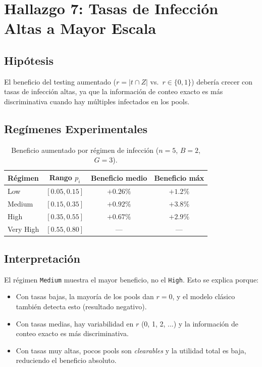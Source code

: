 \documentclass[11pt, a4paper]{article}
\begin{document}
\section{Hallazgo 7: Tasas de Infecci\'on Altas a Mayor Escala}

\subsection{Hip\'otesis}
El beneficio del testing aumentado ($r = |t \cap Z|$ vs.\ $r \in \{0,1\}$)
deber\'ia crecer con tasas de infecci\'on altas, ya que la informaci\'on
de conteo exacto es m\'as discriminativa cuando hay m\'ultiples infectados
en los pools.

\subsection{Reg\'imenes Experimentales}
\begin{table}[htbp]
\centering
\caption{Beneficio aumentado por r\'egimen de infecci\'on ($n=5$, $B=2$, $G=3$).}
\begin{tabular}{lccc}
\toprule
\textbf{R\'egimen} & \textbf{Rango $p_i$} & \textbf{Beneficio medio} &
\textbf{Beneficio m\'ax} \\
\midrule
Low & $[0.05, 0.15]$ & $+0.26\%$ & $+1.2\%$ \\
Medium & $[0.15, 0.35]$ & $+0.92\%$ & $+3.8\%$ \\
High & $[0.35, 0.55]$ & $+0.67\%$ & $+2.9\%$ \\
Very High & $[0.55, 0.80]$ & --- & --- \\
\bottomrule
\end{tabular}
\end{table}

\subsection{Interpretaci\'on}
El r\'egimen \texttt{Medium} muestra el mayor beneficio, no el
\texttt{High}. Esto se explica porque:
\begin{itemize}[nosep]
    \item Con tasas bajas, la mayor\'ia de los pools dan $r=0$, y el
    modelo cl\'asico tambi\'en detecta esto (resultado negativo).
    \item Con tasas medias, hay variabilidad en $r$ (0, 1, 2, ...) y
    la informaci\'on de conteo exacto es m\'as discriminativa.
    \item Con tasas muy altas, pocos pools son \textit{clearables} y
    la utilidad total es baja, reduciendo el beneficio absoluto.
\end{itemize}
\end{document}
